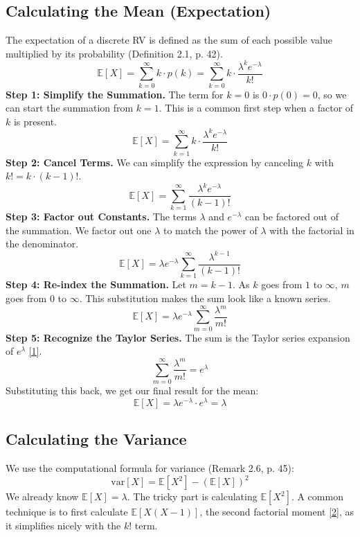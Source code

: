 \documentclass[11pt,a4paper]{article}
\theoremstyle{named}
\begin{document}
\subsection{Calculating the Mean (Expectation)}
The expectation of a discrete RV is defined as the sum of each possible value multiplied by its probability (Definition 2.1, p. 42).
\[
\mathbb{E}[X] = \sum_{k=0}^{\infty} k \cdot p(k) = \sum_{k=0}^{\infty} k \cdot \frac{\lambda^k e^{-\lambda}}{k!}
\]
\textbf{Step 1: Simplify the Summation.} The term for $k=0$ is $0 \cdot p(0) = 0$, so we can start the summation from $k=1$. This is a common first step when a factor of $k$ is present.
\[
\mathbb{E}[X] = \sum_{k=1}^{\infty} k \cdot \frac{\lambda^k e^{-\lambda}}{k!}
\]
\textbf{Step 2: Cancel Terms.} We can simplify the expression by canceling $k$ with $k! = k \cdot (k-1)!$.
\[
\mathbb{E}[X] = \sum_{k=1}^{\infty} \frac{\lambda^k e^{-\lambda}}{(k-1)!}
\]
\textbf{Step 3: Factor out Constants.} The terms $\lambda$ and $e^{-\lambda}$ can be factored out of the summation. We factor out one $\lambda$ to match the power of $\lambda$ with the factorial in the denominator.
\[
\mathbb{E}[X] = \lambda e^{-\lambda} \sum_{k=1}^{\infty} \frac{\lambda^{k-1}}{(k-1)!}
\]
\textbf{Step 4: Re-index the Summation.} Let $m = k-1$. As $k$ goes from $1$ to $\infty$, $m$ goes from $0$ to $\infty$. This substitution makes the sum look like a known series.
\[
\mathbb{E}[X] = \lambda e^{-\lambda} \sum_{m=0}^{\infty} \frac{\lambda^m}{m!}
\]
\textbf{Step 5: Recognize the Taylor Series.} The sum is the Taylor series expansion of $e^\lambda$ \hyperlink{note:1}{[1]}.
\[
\sum_{m=0}^{\infty} \frac{\lambda^m}{m!} = e^\lambda
\]
Substituting this back, we get our final result for the mean:
\[
\mathbb{E}[X] = \lambda e^{-\lambda} \cdot e^\lambda = \lambda
\]

\subsection{Calculating the Variance}
We use the computational formula for variance (Remark 2.6, p. 45):
\[
\text{var}[X] = \mathbb{E}[X^2] - (\mathbb{E}[X])^2
\]
We already know $\mathbb{E}[X] = \lambda$. The tricky part is calculating $\mathbb{E}[X^2]$. A common technique is to first calculate $\mathbb{E}[X(X-1)]$, the second factorial moment \hyperlink{note:2}{[2]}, as it simplifies nicely with the $k!$ term.
\end{document}
